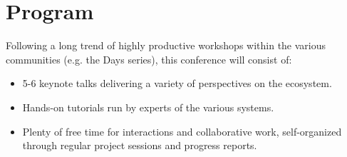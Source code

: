 \documentclass[12pt]{amsart}
\begin{document}
\section*{Program}

Following a long trend of highly productive workshops within the
various communities (e.g. the \Sage Days series), this conference will consist of:
\begin{itemize}
\item 5-6 keynote talks delivering a variety of perspectives on the
  ecosystem.
\item Hands-on tutorials run by experts of the various systems.
\item Plenty of free time for interactions and collaborative work,
  self-organized through regular project sessions and progress
  reports.
\end{itemize}
\end{document}
